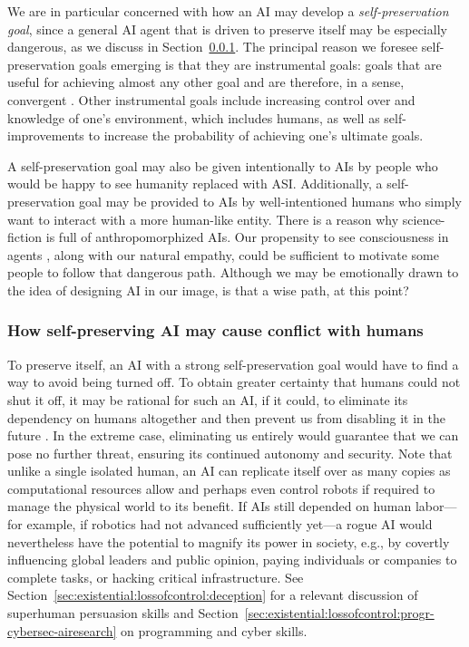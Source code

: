 We are in particular concerned with how an AI may develop a \textit{self-preservation goal}, since a general AI agent that is driven to preserve itself may be especially dangerous, as we discuss in Section~\ref{sec:existential:riskseverity:humanconflict}. The principal reason we foresee self-preservation goals emerging is that they are instrumental goals: goals that are useful for achieving almost any other goal and are therefore, in a sense, convergent \cite{dl.acm.org.doi.10.5555.1566174.1566226}. Other instrumental goals include increasing control over and knowledge of one's environment, which includes humans, as well as self-improvements to increase the probability of achieving one's ultimate goals.

A self-preservation goal may also be given intentionally \cite{arxiv.org.abs.2306.12001} to AIs by people who would be happy to see humanity replaced with ASI. Additionally, a self-preservation goal may be provided to AIs by well-intentioned humans who simply want to interact with a more human-like entity. There is a reason why science-fiction is full of anthropomorphized AIs. Our propensity to see consciousness in agents \cite{www.scientificamerican.com.article.google.engineer.claims.ai.chatbot.is.sentient.why.that.matters,academic.oup.com.nc.article.2024.1.niae013.7644104}, along with our natural empathy, could be sufficient to motivate some people to follow that dangerous path. Although we may be emotionally drawn to the idea of designing AI in our image, is that a wise path, at this point? 



    \subsubsection{How self-preserving AI may cause conflict with humans}
    \label{sec:existential:riskseverity:humanconflict}
    
To preserve itself, an AI with a strong self-preservation goal would have to find a way to avoid being turned off. To obtain greater certainty that humans could not shut it off, it may be rational for such an AI, if it could, to eliminate its dependency on humans altogether and then prevent us from disabling it in the future \cite{en.wikipedia.org.wiki.Superintelligence..Paths..Dangers..Strategies,cohen2024regulating}. In the extreme case, eliminating us entirely would guarantee that we can pose no further threat, ensuring its continued autonomy and security. Note that unlike a single isolated human, an AI can replicate itself over as many copies as computational resources allow and perhaps even control robots if required to manage the physical world to its benefit. If AIs still depended on human labor---for example, if robotics had not advanced sufficiently yet---a rogue AI would nevertheless have the potential to magnify its power in society, e.g., by covertly influencing global leaders and public opinion, paying individuals or companies to complete tasks, or hacking critical infrastructure. See Section~\ref{sec:existential:lossofcontrol:deception} for a relevant discussion of superhuman persuasion skills and Section~\ref{sec:existential:lossofcontrol:progr-cybersec-airesearch} on programming and cyber skills. 

